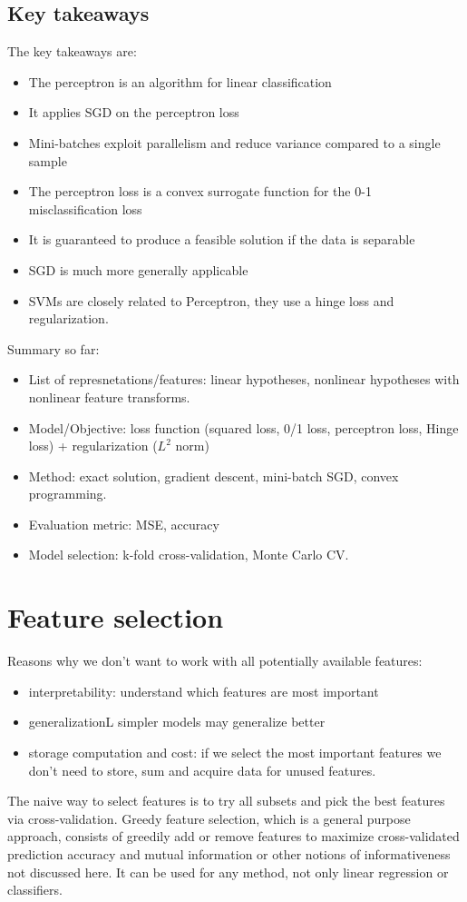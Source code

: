 \documentclass[a4paper,10pt,twoside]{article}
\begin{document}
\subsection{Key takeaways}
The key takeaways are:
\begin{itemize}
    \item The perceptron is an algorithm for linear classification
    \item It applies SGD on the perceptron loss
    \item Mini-batches exploit parallelism and reduce variance compared to a single sample
    \item The perceptron loss is a convex surrogate function for the 0-1 misclassification loss
    \item It is guaranteed to produce a feasible solution if the data is separable
    \item SGD is much more generally applicable
    \item SVMs are closely related to Perceptron, they use a hinge loss and regularization.
\end{itemize}
Summary so far:
\begin{itemize}
    \item List of represnetations/features: linear hypotheses, nonlinear hypotheses with nonlinear feature transforms.
    \item Model/Objective: loss function (squared loss, 0/1 loss, perceptron loss, Hinge loss) + regularization ($L^2$ norm)
    \item Method: exact solution, gradient descent, mini-batch SGD, convex programming.
    \item Evaluation metric: MSE, accuracy
    \item Model selection: k-fold cross-validation, Monte Carlo CV.
\end{itemize}

\section{Feature selection}
Reasons why we don't want to work with all potentially available features:
\begin{itemize}
    \item interpretability: understand which features are most important
    \item generalizationL simpler models may generalize better
    \item storage computation and cost: if we select the most important features we don't need to store, sum and acquire data for unused features. 
\end{itemize}
The naive way to select features is to try all subsets and pick the best features via cross-validation. Greedy feature selection, which is a general purpose approach, consists of greedily add or remove features to maximize cross-validated prediction accuracy and mutual information or other notions of informativeness not discussed here. It can be used for any method, not only linear regression or classifiers. 
\end{document}
